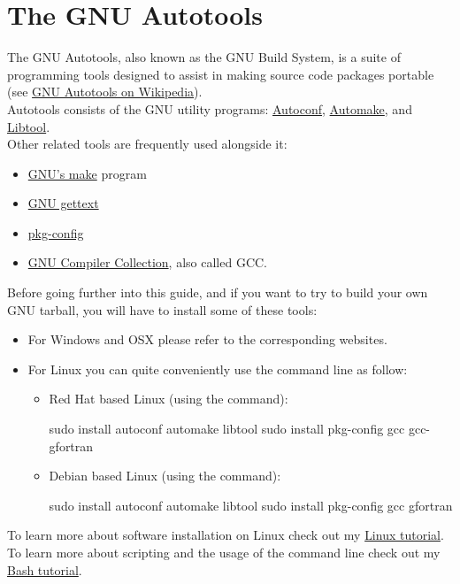 \section{The GNU Autotools}

The GNU Autotools, also known as the GNU Build System, is a suite of programming tools designed to assist in making source code packages portable (see \href{https://en.wikipedia.org/wiki/GNU\_Autotools}{GNU Autotools on Wikipedia}).  \\[0.25cm]
Autotools consists of the GNU utility programs: \href{https://www.gnu.org/software/autoconf/}{Autoconf}, 
\href{https://www.gnu.org/software/automake/}{Automake}, and \href{https://www.gnu.org/software/libtool}{Libtool}. \\
Other related tools are frequently used alongside it: 
\begin{itemize}
\item \href{https://www.gnu.org/software/make/}{GNU's make} program
\item \href{https://www.gnu.org/software/gettext/}{GNU gettext}
\item \href{https://en.wikipedia.org/wiki/Pkg-config}{pkg-config}
\item \href{https://www.gnu.org/software/gcc/}{GNU Compiler Collection}, also called GCC. 
\end{itemize}
Before going further into this guide, and if you want to try to build your own GNU tarball, you will have to install some of these tools: 
\begin{itemize}
\item For Windows and OSX please refer to the corresponding websites.
\item For Linux you can quite conveniently use the command line as follow:
\begin{itemize}
\item Red Hat based Linux (using the  command):
\begin{scriptii}
\fprompt{~} sudo  install autoconf automake libtool
\fprompt{~} sudo  install pkg-config gcc gcc-gfortran
\end{scriptii}
\item Debian based Linux (using the  command):
\begin{scriptii}
\fprompt{~} sudo  install autoconf automake libtool
\fprompt{~} sudo  install pkg-config gcc gfortran
\end{scriptii}
\end{itemize}
\end{itemize}
To learn more about software installation on Linux check out my \href{https://www.ipcms.fr/wp-content/uploads/2021/11/linux.pdf}{Linux tutorial}. \\
To learn more about scripting and the usage of the command line check out my \href{https://www.ipcms.fr/wp-content/uploads/2021/05/bash.pdf}{Bash tutorial}.
\clearpage

